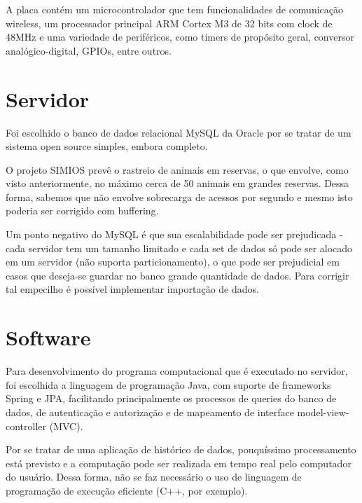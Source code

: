 A placa contém um microcontrolador que tem funcionalidades de comunicação wireless, um processador principal ARM Cortex M3 de 32 bits com clock de 48MHz e uma variedade de periféricos, como timers de propósito geral, conversor analógico-digital, GPIOs, entre outros. 

\section{Servidor}
Foi escolhido o banco de dados relacional MySQL da Oracle por se tratar de um sistema open source simples, embora completo.

O projeto SIMIOS prevê o rastreio de animais em reservas, o que envolve, como visto anteriormente, no máximo cerca de 50 animais em grandes reservas. Dessa forma, sabemos que não envolve sobrecarga de acessos por segundo e mesmo isto poderia ser corrigido com buffering.

Um ponto negativo do MySQL é que sua escalabilidade pode ser prejudicada - cada servidor tem um tamanho limitado e cada set de dados só pode ser alocado em um servidor (não suporta particionamento), o que pode ser prejudicial em casos que deseja-se guardar no banco grande quantidade de dados. Para corrigir tal empecilho é possível implementar importação de dados.

\section{Software}
Para desenvolvimento do programa computacional que é executado no servidor, foi escolhida a linguagem de programação Java, com suporte de frameworks Spring e JPA, facilitando principalmente os processos de queries do banco de dados, de autenticação e autorização e de mapeamento de interface model-view-controller (MVC).

Por se tratar de uma aplicação de histórico de dados, pouquíssimo processamento está previsto e a computação pode ser realizada em tempo real pelo computador do usuário. Dessa forma, não se faz necessário o uso de linguagem de programação de execução eficiente (C++, por exemplo).
